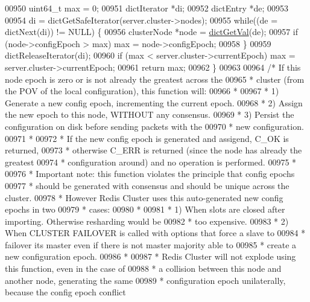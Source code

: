 \begin{DoxyCode}
{{{{{{{{{{{{00950     uint64\_t max = 0;
00951     dictIterator *di;
00952     dictEntry *de;
00953 
00954     di = dictGetSafeIterator(server.cluster->nodes);
00955     \textcolor{keywordflow}{while}((de = dictNext(di)) != NULL) \{
00956         clusterNode *node = \hyperlink{dict_8h_ae8d2cc391873b2bea2b87c4f80f43120}{dictGetVal}(de);
00957         \textcolor{keywordflow}{if} (node->configEpoch > max) max = node->configEpoch;
00958     \}
00959     dictReleaseIterator(di);
00960     \textcolor{keywordflow}{if} (max < server.cluster->currentEpoch) max = server.cluster->currentEpoch;
00961     \textcolor{keywordflow}{return} max;
00962 \}
00963 
00964 \textcolor{comment}{/* If this node epoch is zero or is not already the greatest across the}
00965 \textcolor{comment}{ * cluster (from the POV of the local configuration), this function will:}
00966 \textcolor{comment}{ *}
00967 \textcolor{comment}{ * 1) Generate a new config epoch, incrementing the current epoch.}
00968 \textcolor{comment}{ * 2) Assign the new epoch to this node, WITHOUT any consensus.}
00969 \textcolor{comment}{ * 3) Persist the configuration on disk before sending packets with the}
00970 \textcolor{comment}{ *    new configuration.}
00971 \textcolor{comment}{ *}
00972 \textcolor{comment}{ * If the new config epoch is generated and assigend, C\_OK is returned,}
00973 \textcolor{comment}{ * otherwise C\_ERR is returned (since the node has already the greatest}
00974 \textcolor{comment}{ * configuration around) and no operation is performed.}
00975 \textcolor{comment}{ *}
00976 \textcolor{comment}{ * Important note: this function violates the principle that config epochs}
00977 \textcolor{comment}{ * should be generated with consensus and should be unique across the cluster.}
00978 \textcolor{comment}{ * However Redis Cluster uses this auto-generated new config epochs in two}
00979 \textcolor{comment}{ * cases:}
00980 \textcolor{comment}{ *}
00981 \textcolor{comment}{ * 1) When slots are closed after importing. Otherwise resharding would be}
00982 \textcolor{comment}{ *    too expensive.}
00983 \textcolor{comment}{ * 2) When CLUSTER FAILOVER is called with options that force a slave to}
00984 \textcolor{comment}{ *    failover its master even if there is not master majority able to}
00985 \textcolor{comment}{ *    create a new configuration epoch.}
00986 \textcolor{comment}{ *}
00987 \textcolor{comment}{ * Redis Cluster will not explode using this function, even in the case of}
00988 \textcolor{comment}{ * a collision between this node and another node, generating the same}
00989 \textcolor{comment}{ * configuration epoch unilaterally, because the config epoch conflict}
}}}}}}}}}}}}
\end{DoxyCode}
